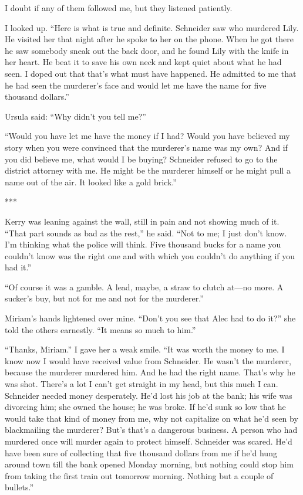 {I doubt if any of them followed me, but they listened patiently.

I looked up. “Here is what is true and definite. Schneider saw who murdered Lily. He visited her that night after he spoke to her on the phone. When he got there he saw somebody sneak out the back door, and he found Lily with the knife in her heart. He beat it to save his own neck and kept quiet about what he had seen. I doped out that that’s what must have happened. He admitted to me that he had seen the murderer’s face and would let me have the name for five thousand dollars.”

Ursula said: “Why didn’t you tell me?”

“Would you have let me have the money if I had? Would you have believed my story when you were convinced that the murderer’s name was my own? And if you did believe me, what would I be buying? Schneider refused to go to the district attorney with me. He might be the murderer himself or he might pull a name out of the air. It looked like a gold brick.”

***

Kerry was leaning against the wall, still in pain and not showing much of it. “That part sounds as bad as the rest,” he said. “Not to me; I just don’t know. I’m thinking what the police will think. Five thousand bucks for a name you couldn’t know was the right one and with which you couldn’t do anything if you had it.”

“Of course it was a gamble. A lead, maybe, a straw to clutch at—no more. A sucker’s buy, but not for me and not for the murderer.”

Miriam’s hands lightened over mine. “Don’t you see that Alec had to do it?” she told the others earnestly. “It means so much to him.”

“Thanks, Miriam.” I gave her a weak smile. “It was worth the money to me. I know now I would have received value from Schneider. He wasn’t the murderer, because the murderer murdered him. And he had the right name. That’s why he was shot. There’s a lot I can’t get straight in my head, but this much I can. Schneider needed money desperately. He’d lost his job at the bank; his wife was divorcing him; she owned the house; he was broke. If he’d sunk so low that he would take that kind of money from me, why not capitalize on what he’d seen by blackmailing the murderer? But’s that’s a dangerous business. A person who had murdered once will murder again to protect himself. Schneider was scared. He’d have been sure of collecting that five thousand dollars from me if he’d hung around town till the bank opened Monday morning, but nothing could stop him from taking the first train out tomorrow morning. Nothing but a couple of bullets.”

}
